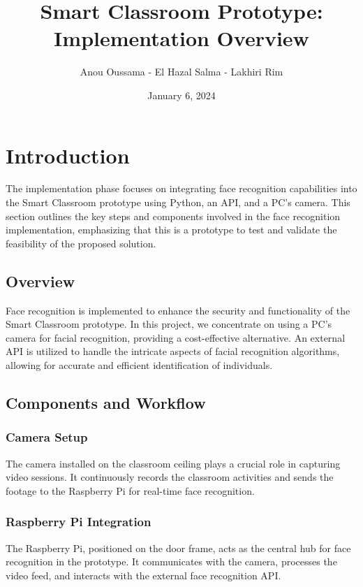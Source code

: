 \documentclass[11pt]{article}
\title{\textbf{Smart Classroom Prototype: Implementation Overview}}
\author{Anou Oussama - El Hazal Salma - Lakhiri Rim}
\date{January 6, 2024}
\begin{document}
	\maketitle
	
	\section{Introduction}
	\hspace{1cm} The implementation phase focuses on integrating face recognition capabilities into the Smart Classroom prototype using Python, an API, and a PC's camera. This section outlines the key steps and components involved in the face recognition implementation, emphasizing that this is a prototype to test and validate the feasibility of the proposed solution.
	
	\hspace{1cm} \subsection{Overview}
	\hspace{1cm} Face recognition is implemented to enhance the security and functionality of the Smart Classroom prototype. In this project, we concentrate on using a PC's camera for facial recognition, providing a cost-effective alternative. An external API is utilized to handle the intricate aspects of facial recognition algorithms, allowing for accurate and efficient identification of individuals.
	
	\hspace{1cm} \subsection{Components and Workflow}
	 \subsubsection{Camera Setup}
	\hspace{1cm} \hspace{1cm} The camera installed on the classroom ceiling plays a crucial role in capturing video sessions. It continuously records the classroom activities and sends the footage to the Raspberry Pi for real-time face recognition.
	
	\hspace{1cm} \hspace{1cm} \subsubsection{Raspberry Pi Integration}
	\hspace{1cm} \hspace{1cm} The Raspberry Pi, positioned on the door frame, acts as the central hub for face recognition in the prototype. It communicates with the camera, processes the video feed, and interacts with the external face recognition API.
	
\end{document}
